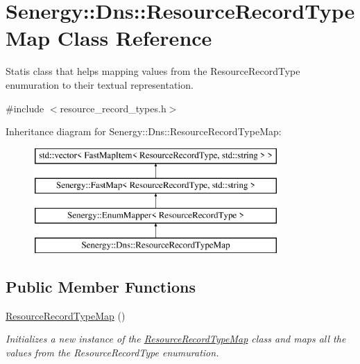 \hypertarget{class_senergy_1_1_dns_1_1_resource_record_type_map}{\section{Senergy\-:\-:Dns\-:\-:Resource\-Record\-Type\-Map Class Reference}
\label{class_senergy_1_1_dns_1_1_resource_record_type_map}
}


Statis class that helps mapping values from the Resource\-Record\-Type enumuration to their textual representation.  




{\ttfamily \#include $<$resource\-\_\-record\-\_\-types.\-h$>$}

Inheritance diagram for Senergy\-:\-:Dns\-:\-:Resource\-Record\-Type\-Map\-:\begin{figure}[H]
\begin{center}
\leavevmode
\includegraphics[height=4.000000cm]{class_senergy_1_1_dns_1_1_resource_record_type_map}
\end{center}
\end{figure}
\subsection*{Public Member Functions}
\begin{DoxyCompactItemize}
\item 
\hyperlink{class_senergy_1_1_dns_1_1_resource_record_type_map_ae64533ac9d0639fcf887888cd0d975c7}{Resource\-Record\-Type\-Map} ()
\begin{DoxyCompactList}\small\item\em Initializes a new instance of the \hyperlink{class_senergy_1_1_dns_1_1_resource_record_type_map}{Resource\-Record\-Type\-Map} class and maps all the values from the Resource\-Record\-Type enumuration. \end{DoxyCompactList}\end{DoxyCompactItemize}
